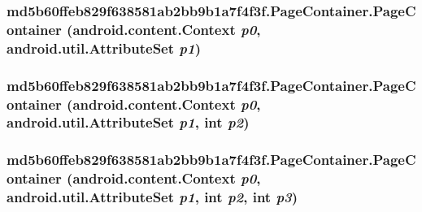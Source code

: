 \hypertarget{classmd5b60ffeb829f638581ab2bb9b1a7f4f3f_1_1_page_container_d550ad5dcde007c81aaee8e4be4778c1}{
\subsubsection[{PageContainer}]{\setlength{\rightskip}{0pt plus 5cm}md5b60ffeb829f638581ab2bb9b1a7f4f3f.PageContainer.PageContainer (android.content.Context {\em p0}, \/  android.util.AttributeSet {\em p1})}}
\label{classmd5b60ffeb829f638581ab2bb9b1a7f4f3f_1_1_page_container_d550ad5dcde007c81aaee8e4be4778c1}


\hypertarget{classmd5b60ffeb829f638581ab2bb9b1a7f4f3f_1_1_page_container_f875cc61d7fd276d67a7364fc9282d2b}{
\subsubsection[{PageContainer}]{\setlength{\rightskip}{0pt plus 5cm}md5b60ffeb829f638581ab2bb9b1a7f4f3f.PageContainer.PageContainer (android.content.Context {\em p0}, \/  android.util.AttributeSet {\em p1}, \/  int {\em p2})}}
\label{classmd5b60ffeb829f638581ab2bb9b1a7f4f3f_1_1_page_container_f875cc61d7fd276d67a7364fc9282d2b}


\hypertarget{classmd5b60ffeb829f638581ab2bb9b1a7f4f3f_1_1_page_container_ea67ff0782cec21a82e2017351bda69f}{
\subsubsection[{PageContainer}]{\setlength{\rightskip}{0pt plus 5cm}md5b60ffeb829f638581ab2bb9b1a7f4f3f.PageContainer.PageContainer (android.content.Context {\em p0}, \/  android.util.AttributeSet {\em p1}, \/  int {\em p2}, \/  int {\em p3})}}
\label{classmd5b60ffeb829f638581ab2bb9b1a7f4f3f_1_1_page_container_ea67ff0782cec21a82e2017351bda69f}




